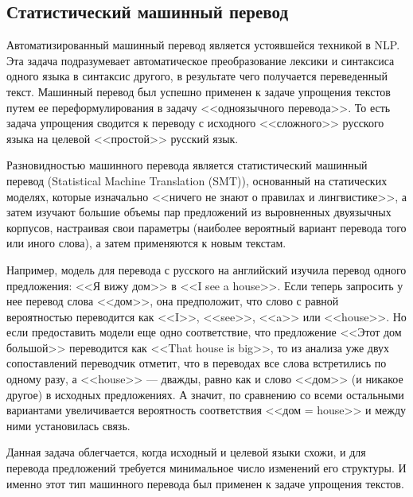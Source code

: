 \subsection{Статистический машинный перевод}
Автоматизированный машинный перевод является устоявшейся техникой в NLP. Эта задача подразумевает автоматическое преобразование лексики и синтаксиса одного языка в синтаксис другого, в результате чего получается переведенный текст. Машинный перевод был успешно применен\cite{shardlow_survey_2014} к задаче упрощения текстов путем ее переформулирования в задачу <<одноязычного перевода>>. То есть задача упрощения сводится к переводу с исходного <<сложного>> русского языка на целевой <<простой>> русский язык.

Разновидностью машинного перевода является статистический машинный перевод (Statistical Machine Translation (SMT)), основанный на статических моделях, которые изначально <<ничего не знают о правилах и лингвистике>>, а затем изучают большие объемы пар предложений из выровненных двуязычных корпусов, настраивая свои параметры (наиболее вероятный вариант перевода того или иного слова), а затем применяются к новым текстам. 

Например, модель для перевода с русского на английский изучила перевод одного предложения: <<Я вижу дом>> в <<I see a house>>. Если теперь запросить у нее перевод слова <<дом>>, она предположит, что слово с равной вероятностью переводится как <<I>>, <<see>>, <<a>> или <<house>>. Но если предоставить модели еще одно соответствие, что предложение <<Этот дом большой>> переводится как <<That house is big>>, то из анализа уже двух сопоставлений переводчик отметит, что в переводах все слова встретились по одному разу, а <<house>> — дважды, равно как и слово <<дом>> (и никакое другое) в исходных предложениях. А значит, по сравнению со всеми остальными вариантами увеличивается вероятность соответствия <<дом = house>> и между ними установилась связь. 

Данная задача облегчается, когда исходный и целевой языки схожи, и для перевода предложений требуется минимальное число изменений его структуры. И именно этот тип машинного перевода был применен к задаче упрощения текстов\cite{shardlow_survey_2014}.



